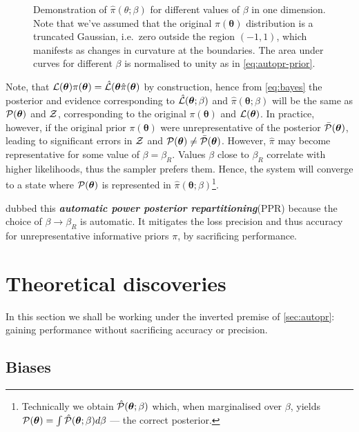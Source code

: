 \documentclass[usenatbib]{mnras}
\begin{document}
\begin{figure}
 
 \caption{\label{fig:ppr} Demonstration of
   \(\hat{\pi}(\theta; \beta)\) for different values of \(\beta\) in
   one dimension. Note that we've assumed that the original
   \( \pi (\bm{\theta})\) distribution is a truncated Gaussian,
   i.e.~zero outside the region \((-1, 1)\), which manifests as
   changes in curvature at the boundaries. The area under curves for
   different $\beta$ is normalised to unity as in
   \cref{eq:autopr-prior}. }
\end{figure}

Note, that
\({\cal L}(\bm{\theta})\pi (\bm{\theta}) = \hat{\cal L}(\bm{\theta}
\hat{\pi} (\bm{\theta})\) by construction, hence from \cref{eq:bayes}
the posterior and evidence corresponding to
\(\hat{\cal L}(\bm{\theta};\beta)\) and
\(\hat{\pi} (\bm{\theta};\beta)\) will be the same as
\( {\cal P} (\bm{\theta})\) and \({\cal Z}\), corresponding to the
original $\pi(\bm{\theta})$ and ${\cal L}(\bm{\theta})$.  In practice,
however, if the original prior \(\pi (\bm{\theta})\) were unrepresentative
of the posterior \( \bar{\cal P} (\bm{\theta})\), leading to
significant errors in ${\cal Z}$ and
${\cal P}(\bm{\theta}) \ne \bar{\cal P}(\bm{\theta})$.  However,
$\hat{\pi}$ may become representative for some value of
$\beta = \beta_{R}$. Values $\beta$ close to $\beta_{R}$
correlate with higher likelihoods, thus the sampler prefers
them. Hence, the system will converge to a state where
\( {\cal P} (\bm{\theta})\) is represented in
\(\hat{\pi} (\bm{\theta};\beta)\)\footnote{Technically we obtain
  \( \hat{\cal P} (\bm{\theta};\beta)\) which, when marginalised over
  $\beta$, yields
  \( {\cal P} (\bm{\theta}) = \int \hat{\cal P} (\bm{\theta};\beta) d
  \beta\) --- the correct posterior.}.

\cite{chen-ferroz-hobson} dubbed this \textbf{\emph{automatic power posterior
  repartitioning}}(PPR) because the choice of
$\beta\rightarrow\beta_{R}$ is automatic. It mitigates the loss
precision and thus accuracy for unrepresentative informative priors
$\pi$, by sacrificing performance.


\section{Theoretical discoveries}
In this section we shall be working under the inverted premise of
\cref{sec:autopr}: gaining performance without sacrificing accuracy or
precision.

\subsection{Biases\label{discussion-bias}}
\end{document}
